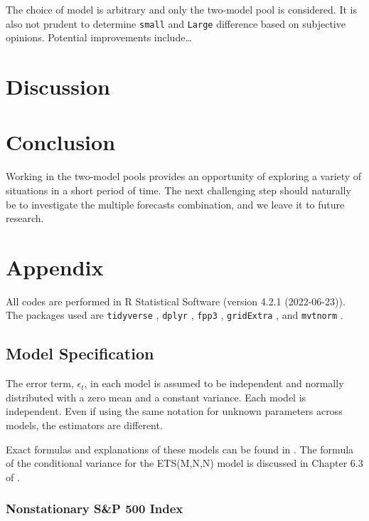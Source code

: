 \documentclass{monashthesis}
\begin{document}
The choice of model is arbitrary and only the two-model pool is considered. It is also not prudent to determine \texttt{small} and \texttt{Large} difference based on subjective opinions. Potential improvements include\ldots{}

\hypertarget{discussion}{%
\chapter{Discussion}\label{discussion}}

\hypertarget{conclusion}{%
\chapter{Conclusion}\label{conclusion}}

Working in the two-model pools provides an opportunity of exploring a variety of situations in a short period of time. The next challenging step should naturally be to investigate the multiple forecasts combination, and we leave it to future research.

\appendix

\hypertarget{appendix}{%
\chapter{Appendix}\label{appendix}}

All codes are performed in R Statistical Software (version 4.2.1 (2022-06-23)). The packages used are \texttt{tidyverse} \autocite{tidy19}, \texttt{dplyr} \autocite{dplyr23}, \texttt{fpp3} \autocite{fpp23}, \texttt{gridExtra} \autocite{gridExtra}, and \texttt{mvtnorm} \autocite{GBMMLSH21}.

\hypertarget{model-specification}{%
\section{Model Specification}\label{model-specification}}

The error term, \(\epsilon_t\), in each model is assumed to be independent and normally distributed with a zero mean and a constant variance. Each model is independent. Even if using the same notation for unknown parameters across models, the estimators are different.

Exact formulas and explanations of these models can be found in \textcite{fpp3}. The formula of the conditional variance for the ETS(M,N,N) model is discussed in Chapter 6.3 of \textcite{HKOS08}.

\hypertarget{nonstationary-sp-500-index}{%
\subsection{Nonstationary S\&P 500 Index}\label{nonstationary-sp-500-index}}
\end{document}
